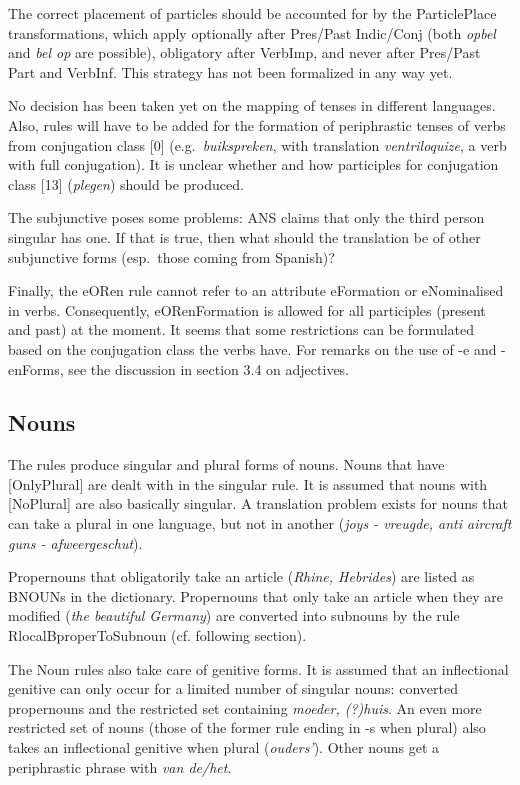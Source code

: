 The correct placement of particles should be accounted for by the ParticlePlace 
transformations, which apply optionally after Pres/Past Indic/Conj (both {\em opbel} and 
{\em bel op} are possible), obligatory after VerbImp, and never after Pres/Past 
Part and VerbInf. This strategy has not been formalized in any way yet.

No decision has been taken yet on the mapping of tenses in different languages. 
Also, rules will have to be added for the formation of periphrastic tenses of 
verbs from conjugation class [0] (e.g.\ {\em buikspreken\/}, with translation 
{\em ventriloquize\/}, a verb with full conjugation). It is unclear whether and how 
participles for conjugation class [13] ({\em plegen}) should be produced.

The subjunctive poses some problems: ANS claims that only the third person 
singular has one. If that is true, then what should the translation be of other 
subjunctive forms (esp.\ those coming from Spanish)?

Finally, the eORen rule cannot refer to an attribute eFormation or eNominalised
in verbs. Consequently, eORenFormation is allowed for all participles (present and 
past) at the moment. It seems that some restrictions can be formulated based on 
the conjugation class the verbs have. For remarks on the use of -e and -enForms, 
see the discussion in section 3.4 on adjectives.

\subsection{Nouns}

The rules produce singular and plural forms of nouns. Nouns that have 
[OnlyPlural] are dealt with in the singular rule. It is assumed that nouns with 
[NoPlural] are also basically singular. A translation problem exists for nouns 
that can take a plural in one language, but not in another 
({\em joys - vreugde, anti aircraft guns - afweergeschut}).

Propernouns that obligatorily take an article ({\em Rhine, Hebrides}) are listed 
as BNOUNs in the dictionary. Propernouns that only take an article when they 
are modified ({\em the beautiful Germany}) are converted into subnouns by the 
rule RlocalBproperToSubnoun (cf. following section).

The Noun rules also take care of genitive forms. It is assumed that an 
inflectional genitive can only occur for a limited number of singular nouns:
converted propernouns and the restricted set containing 
{\em moeder, (?)huis\/}. An even more restricted set of nouns (those of the 
former rule ending in -s when plural) also takes an 
inflectional genitive when plural ({\em ouders'\/}).
Other nouns get a periphrastic phrase with {\em van de/het\/}.

